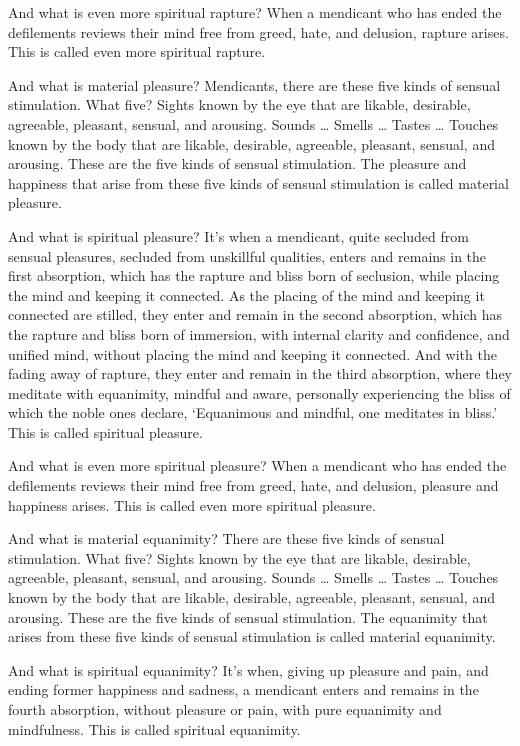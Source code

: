 \documentclass[12pt,openany]{book}%
\begin{document}
And what is even more spiritual rapture? When a mendicant who has ended the defilements reviews their mind free from greed, hate, and delusion, rapture arises. This is called even more spiritual rapture. 

And what is material pleasure? Mendicants, there are these five kinds of sensual stimulation. What five? Sights known by the eye that are likable, desirable, agreeable, pleasant, sensual, and arousing. Sounds … Smells … Tastes … Touches known by the body that are likable, desirable, agreeable, pleasant, sensual, and arousing. These are the five kinds of sensual stimulation. The pleasure and happiness that arise from these five kinds of sensual stimulation is called material pleasure. 

And what is spiritual pleasure? It’s when a mendicant, quite secluded from sensual pleasures, secluded from unskillful qualities, enters and remains in the first absorption, which has the rapture and bliss born of seclusion, while placing the mind and keeping it connected. As the placing of the mind and keeping it connected are stilled, they enter and remain in the second absorption, which has the rapture and bliss born of immersion, with internal clarity and confidence, and unified mind, without placing the mind and keeping it connected. And with the fading away of rapture, they enter and remain in the third absorption, where they meditate with equanimity, mindful and aware, personally experiencing the bliss of which the noble ones declare, ‘Equanimous and mindful, one meditates in bliss.’ This is called spiritual pleasure. 

And what is even more spiritual pleasure? When a mendicant who has ended the defilements reviews their mind free from greed, hate, and delusion, pleasure and happiness arises. This is called even more spiritual pleasure. 

And what is material equanimity? There are these five kinds of sensual stimulation. What five? Sights known by the eye that are likable, desirable, agreeable, pleasant, sensual, and arousing. Sounds … Smells … Tastes … Touches known by the body that are likable, desirable, agreeable, pleasant, sensual, and arousing. These are the five kinds of sensual stimulation. The equanimity that arises from these five kinds of sensual stimulation is called material equanimity. 

And what is spiritual equanimity? It’s when, giving up pleasure and pain, and ending former happiness and sadness, a mendicant enters and remains in the fourth absorption, without pleasure or pain, with pure equanimity and mindfulness. This is called spiritual equanimity. 
\end{document}

